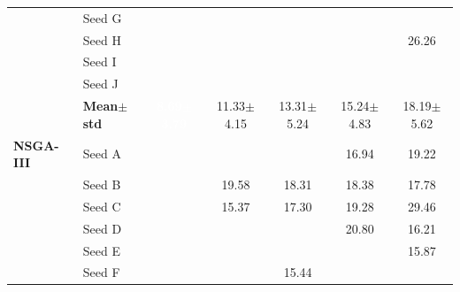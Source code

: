 \begin{table}[H]
{\begin{tabular}{@{}llccccc@{}}
  & Seed G & \cellcolor{RoyalBlue!10}{\small 8.00} & \cellcolor{RoyalBlue!10}{\small 9.78} & \cellcolor{RoyalBlue!10}{\small 10.61} & \cellcolor{RoyalBlue!10}{\small 12.82} & \cellcolor{RoyalBlue!10}{\small 13.98} \\
  & Seed H & \cellcolor{RoyalBlue!10}{\small 6.80} & \cellcolor{RoyalBlue!10}{\small 8.15} & \cellcolor{RoyalBlue!10}{\small 14.95} & \cellcolor{RoyalBlue!10}{\small 12.28} & {\small\color{gray!60!black}26.26} \\
  & Seed I & \cellcolor{RoyalBlue!10}{\small 5.82} & \cellcolor{RoyalBlue!10}{\small 7.93} & \cellcolor{RoyalBlue!10}{\small 9.30} & \cellcolor{RoyalBlue!10}{\small 11.97} & \cellcolor{RoyalBlue!10}{\small 12.49} \\
  & Seed J & \cellcolor{RoyalBlue!10}{\small 5.87} & \cellcolor{RoyalBlue!10}{\small 11.55} & \cellcolor{RoyalBlue!10}{\small 11.32} & \cellcolor{RoyalBlue!10}{\small 9.98} & \cellcolor{RoyalBlue!10}{\small 11.97} \\
 & \textbf{Mean$\pm$std} & \cellcolor{RoyalBlue!65}\textcolor{white}{\textbf{8.69$\pm$3.79}} & \cellcolor{RoyalBlue!20}11.33$\pm$4.15 & \cellcolor{RoyalBlue!20}13.31$\pm$5.24 & \cellcolor{red!12}15.24$\pm$4.83 & \cellcolor{red!12}18.19$\pm$5.62 \\
\midrule
 \textbf{NSGA-III} & Seed A & \cellcolor{RoyalBlue!10}{\small 8.94} & \cellcolor{RoyalBlue!10}{\small 11.68} & \cellcolor{RoyalBlue!10}{\small 13.28} & {\small\color{gray!60!black}16.94} & {\small\color{gray!60!black}19.22} \\
  & Seed B & \cellcolor{RoyalBlue!10}{\small 13.41} & {\small\color{gray!60!black}19.58} & {\small\color{gray!60!black}18.31} & {\small\color{gray!60!black}18.38} & {\small\color{gray!60!black}17.78} \\
  & Seed C & \cellcolor{RoyalBlue!10}{\small 13.94} & {\small\color{gray!60!black}15.37} & {\small\color{gray!60!black}17.30} & {\small\color{gray!60!black}19.28} & {\small\color{gray!60!black}29.46} \\
  & Seed D & \cellcolor{RoyalBlue!10}{\small 7.67} & \cellcolor{RoyalBlue!10}{\small 10.64} & \cellcolor{RoyalBlue!10}{\small 10.41} & {\small\color{gray!60!black}20.80} & {\small\color{gray!60!black}16.21} \\
  & Seed E & \cellcolor{RoyalBlue!10}{\small 5.77} & \cellcolor{RoyalBlue!10}{\small 13.50} & \cellcolor{RoyalBlue!10}{\small 10.10} & \cellcolor{RoyalBlue!10}{\small 12.04} & {\small\color{gray!60!black}15.87} \\
  & Seed F & \cellcolor{RoyalBlue!10}{\small 9.13} & \cellcolor{RoyalBlue!10}{\small 7.49} & {\small\color{gray!60!black}15.44} & \cellcolor{RoyalBlue!10}{\small 11.31} & \cellcolor{RoyalBlue!10}{\small 14.16} \\

\end{tabular}}
\end{table}
